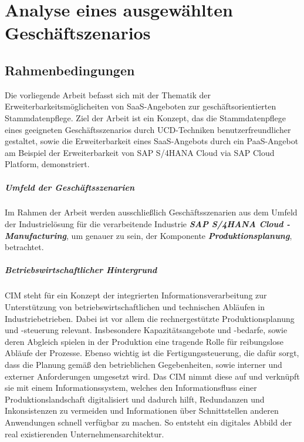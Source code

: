 \chapter{Analyse eines ausgewählten Geschäftszenarios}
% 
% 
% 
% 
% 
% 
\section{Rahmenbedingungen}
Die vorliegende Arbeit befasst sich mit der Thematik der Erweiterbarkeitsmöglicheiten von \ac{SaaS}-Angeboten zur geschäftsorientierten Stammdatenpflege. Ziel der Arbeit ist ein Konzept, das die Stammdatenpflege eines geeigneten Geschäftsszenarios durch \ac{UCD}-Techniken benutzerfreundlicher gestaltet, sowie die Erweiterbarkeit eines \ac{SaaS}-Angebots durch ein \ac{PaaS}-Angebot am Beispiel der Erweiterbarkeit von SAP S/4HANA Cloud via SAP Cloud Platform, demonstriert.

\paragraph{Umfeld der Geschäftsszenarien}
Im Rahmen der Arbeit werden ausschließlich Geschäftsszenarien aus dem Umfeld der Industrielösung für die verarbeitende Industrie \textit{\textbf{SAP S/4HANA Cloud - Manufacturing}}, um genauer zu sein, der Komponente \textit{\textbf{Produktionsplanung}}, betrachtet.

\paragraph{Betriebswirtschaftlicher Hintergrund} \ac{CIM} steht für ein Konzept der integrierten Informationsverarbeitung zur Unterstützung von betriebswirtschaftlichen und technischen Abläufen in Industriebetrieben. Dabei ist vor allem die rechnergestützte Produktionsplanung und -steuerung relevant. Insbesondere Kapazitätsangebote und -bedarfe, sowie deren Abgleich spielen in der Produktion eine tragende Rolle für reibungslose Abläufe der Prozesse. Ebenso wichtig ist die Fertigungssteuerung, die dafür sorgt, dass die Planung gemäß den betrieblichen Gegebenheiten, sowie interner und externer Anforderungen umgesetzt wird. Das \ac{CIM}  nimmt diese auf und verknüpft sie mit einem Informationssystem, welches den Informationsfluss einer Produktionslandschaft digitalisiert und dadurch hilft, Redundanzen und Inkonsistenzen zu vermeiden und Informationen über Schnittstellen anderen Anwendungen schnell verfügbar zu machen. So entsteht ein digitales Abbild der real existierenden Unternehmensarchitektur.
\autocite{Dickersbach.2014}

